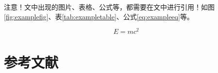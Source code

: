 \documentclass{CUCProposal}
\begin{document}
{  注意！文中出现的图片、表格、公式等，都需要在文中进行引用！如图\ref{fig:examplefig}、表\ref{tab:exampletable}、公式\ref{eq:exampleeq}等。

  \begin{equation}
    E = mc^2 
    \label{eq:exampleeq}
  \end{equation}

  \section{参考文献}
  \printbibliography[heading=none]
}
{
  \zhlipsum[5]
}
\end{document}
